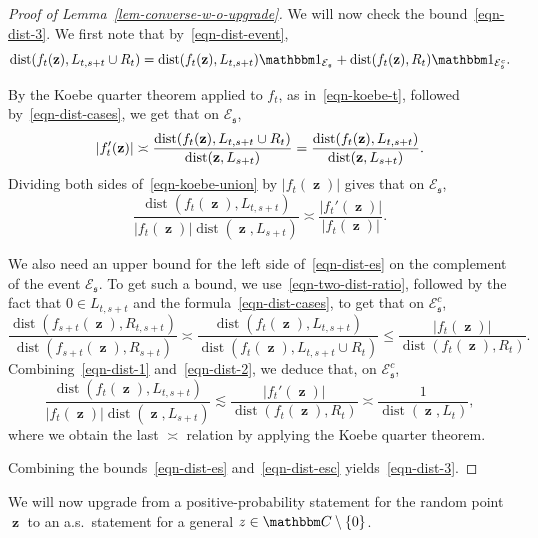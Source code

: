 \documentclass[11pt]{article}
\theoremstyle{plain}
\theoremstyle{definition}
\numberwithin{equation}{section}
\newcommand{\eqb}{\begin{equation}}
\newcommand{\eqe}{\end{equation}}
\newcommand{\BB}{\mathbbm}
\newcommand{\op}{\operatorname}
\newcommand{\mcl}{\mathcal}
\newcommand{\dist}{{\operatorname{dist}}}
\newcommand{\zz}{{\op{\mathbf{z}}}}
\newcommand{\sz}{{\mathfrak s}}
\let\originalleft\left
\let\originalright\right
\renewcommand{\left}{\mathopen{}\mathclose\bgroup\originalleft}
\renewcommand{\right}{\aftergroup\egroup\originalright}
\begin{document}
\begin{proof}[Proof of Lemma~\ref{lem-converse-w-o-upgrade}]
We will now check the bound~\eqref{eqn-dist-3}. We first note that by~\eqref{eqn-dist-event}, 
\eqb \label{eqn-dist-cases}
\op{dist}\left( f_t(\zz) , L_{t,s+t} \cup R_t \right)
= \op{dist}\left( f_t(\zz) , L_{t,s+t}  \right) \BB 1_{\mcl E_\sz} + \op{dist}\left( f_t(\zz) , R_t  \right) \BB 1_{\mcl E_\sz^c} .
\eqe
 
By the Koebe quarter theorem applied to $f_t$, as in~\eqref{eqn-koebe-t}, followed by~\eqref{eqn-dist-cases}, we get that on $\mcl E_\sz$, 
\eqb \label{eqn-koebe-union}
|f_t'(\zz)| 
\asymp \frac{\op{dist}\left( f_t(\zz) , L_{t,s+t} \cup R_t \right)}{\op{dist}(\zz , L_{s+t})}
= \frac{\op{dist}\left( f_t(\zz) , L_{t,s+t} \right)}{\op{dist}(\zz , L_{s+t})} .
\eqe
Dividing both sides of~\eqref{eqn-koebe-union} by $|f_t(\zz)|$ gives that on $\mcl E_\sz$, 
\eqb
 \frac{\dist(f_t(\zz),L_{t,s+t})}{|f_t(\zz)| \dist(\zz,L_{s+t})} \asymp \frac{|f_t'(\zz)|}{|f_t(\zz)|} . 
\label{eqn-dist-es}
\eqe 

We also need an upper bound for the left side of~\eqref{eqn-dist-es} on the complement of the event $\mcl{E}_{\sz}$. To get such a bound, we use~\eqref{eqn-two-dist-ratio}, followed by the fact that $0\in L_{t,s+t}$ and the formula~\eqref{eqn-dist-cases}, to get that on $\mcl E_\sz^c$, 
\eqb
\frac{\dist(f_{s+t}(\zz),R_{t,s+t})}{\dist(f_{s+t}(\zz),R_{s+t})} \asymp \frac{\dist(f_t(\zz),L_{t,s+t})}{\dist(f_t(\zz), L_{t,s+t} \cup R_t)} \leq \frac{|f_t(\zz)|}{\dist(f_t(\zz),R_t)}.
\label{eqn-dist-2}
\eqe
Combining~\eqref{eqn-dist-1} and~\eqref{eqn-dist-2}, we deduce that, on $\mcl{E}_{\sz}^c$, 
\eqb
\frac{\dist(f_t(\zz),L_{t,s+t})}{|f_t(\zz)| \dist(\zz,L_{s+t})} \lesssim \frac{|f_t'(\zz)|}{\dist(f_t(\zz),R_t)} \asymp \frac{1}{\dist(\zz,L_t)},
\label{eqn-dist-esc}
\eqe
where we obtain the last $\asymp$ relation by applying the Koebe quarter theorem.

Combining the bounds~\eqref{eqn-dist-es} and~\eqref{eqn-dist-esc}  yields~\eqref{eqn-dist-3}.
\end{proof}


We will now upgrade from a positive-probability statement for the random point $\zz$ to an a.s.\ statement for a general $z\in \BB C\setminus \{0\}$. 
\end{document}
